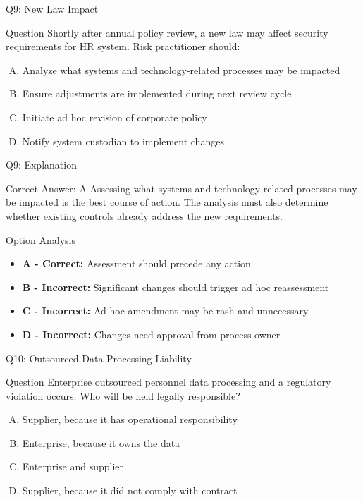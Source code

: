 \documentclass{beamer}
\begin{document}
	\begin{frame}{Q9: New Law Impact}
		\begin{block}{Question}
			Shortly after annual policy review, a new law may affect security requirements for HR system. Risk practitioner should:
		\end{block}
		\begin{enumerate}[(A)]
			\item Analyze what systems and technology-related processes may be impacted
			\item Ensure adjustments are implemented during next review cycle
			\item Initiate ad hoc revision of corporate policy
			\item Notify system custodian to implement changes
		\end{enumerate}
	\end{frame}
	
	\begin{frame}{Q9: Explanation}
		\begin{block}{Correct Answer: A}
			Assessing what systems and technology-related processes may be impacted is the best course of action. The analysis must also determine whether existing controls already address the new requirements.
		\end{block}
		\begin{block}{Option Analysis}
			\begin{itemize}
				\item \textbf{A - Correct:} Assessment should precede any action
				\item \textbf{B - Incorrect:} Significant changes should trigger ad hoc reassessment
				\item \textbf{C - Incorrect:} Ad hoc amendment may be rash and unnecessary
				\item \textbf{D - Incorrect:} Changes need approval from process owner
			\end{itemize}
		\end{block}
	\end{frame}
	
	\begin{frame}{Q10: Outsourced Data Processing Liability}
		\begin{block}{Question}
			Enterprise outsourced personnel data processing and a regulatory violation occurs. Who will be held legally responsible?
		\end{block}
		\begin{enumerate}[(A)]
			\item Supplier, because it has operational responsibility
			\item Enterprise, because it owns the data
			\item Enterprise and supplier
			\item Supplier, because it did not comply with contract
		\end{enumerate}
	\end{frame}
	
\end{document}

